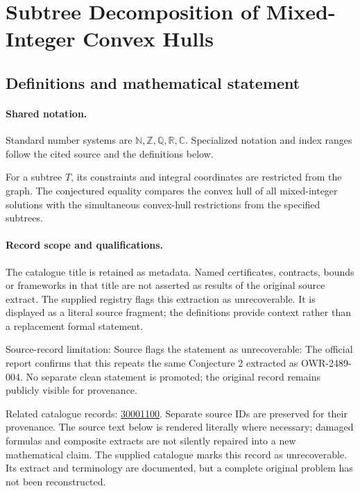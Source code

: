 \documentclass[11pt]{article}
\begin{document}
\section{Subtree Decomposition of Mixed-Integer Convex Hulls}\label{statement}

\subsection{Definitions and mathematical statement}

\paragraph{Shared notation.}Standard number systems are $\mathbb N,\mathbb Z,\mathbb Q,\mathbb R,\mathbb C$. Specialized notation and index ranges follow the cited source and the definitions below.


For a subtree $T$, its constraints and integral coordinates are restricted from the graph. The conjectured equality compares the convex hull of all mixed-integer solutions with the simultaneous convex-hull restrictions from the specified subtrees.
\paragraph{Record scope and qualifications.}
The catalogue title is retained as metadata. Named certificates, contracts, bounds or frameworks in that title are not asserted as results of the original source extract.
The supplied registry flags this extraction as unrecoverable. It is displayed as a literal source fragment; the definitions provide context rather than a replacement formal statement.

Source-record limitation: Source flags the statement as unrecoverable: The official report confirms that this repeats the same Conjecture 2 extracted as OWR-2489-004. No separate clean statement is promoted; the original record remains publicly visible for provenance.

Related catalogue records: \href{https://mehmetmars7.github.io/Erdosproblems-llm-hunter/problem.html?type=open_problems&id=30001100}{30001100}. Separate source IDs are preserved for their provenance.
The source text below is rendered literally where necessary; damaged formulas and composite extracts are not silently repaired into a new mathematical claim.
The supplied catalogue marks this record as unrecoverable. Its extract and terminology are documented, but a complete original problem has not been reconstructed.
\end{document}
